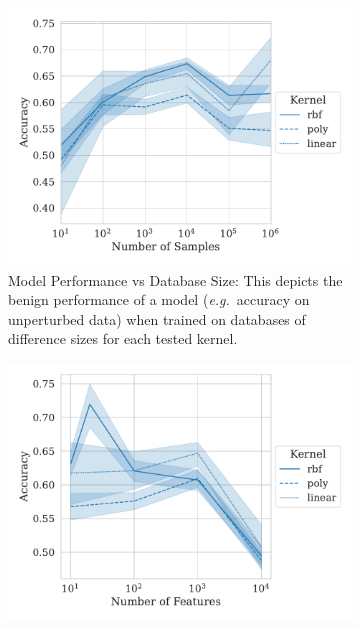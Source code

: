 \documentclass[fonts]{icst}
\begin{document}
\begin{figure}
    \centering
    \begin{subfigure}{.45\textwidth}
        \centering
        \includegraphics[width=\textwidth]{./generated/accuracy_vs_samples.pdf}
        \caption{Model Performance vs Database Size: This depicts the benign performance  of a model  (\textit{e.g.}~accuracy on unperturbed data) when trained on databases of difference sizes for each tested kernel.}
        \label{fig:samples_acc}
    \end{subfigure}
    \hfill
    \begin{subfigure}{.45\textwidth}
        \centering
        \includegraphics[width=\textwidth]{./generated/accuracy_vs_features.pdf}

\end{subfigure}
\end{figure}
\end{document}
